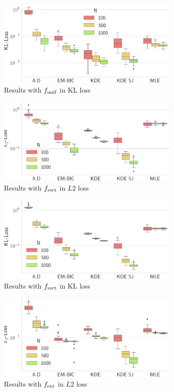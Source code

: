 \begin{figure}
    \includegraphics[width=0.8\textwidth]{./TeX_files/res_uniform_KL.png}
    \caption{Results with $f_{\textnormal{unif}}$ in KL loss}
    \label{fig:res_uniform_KL}
\end{figure}
\begin{figure}
    \includegraphics[width=0.8\textwidth]{./TeX_files/res_rect_L2.png}
    \caption{Results with $f_{\textnormal{rect}}$ in $L2$ loss}
    \label{fig:res_rect_L2}
\end{figure}

\begin{figure}
    \includegraphics[width=0.8\textwidth]{./TeX_files/res_rect_KL.png}
    \caption{Results with $f_{\textnormal{rect}}$ in KL loss}
    \label{fig:res_rect_KL}
\end{figure}   
\begin{figure}
    \includegraphics[width=0.8\textwidth]{./TeX_files/res_lapl_gauss_not_dict_L2.png}
    \caption{Results with $f_{\textnormal{ext}}$ in $L2$ loss}
    \label{fig:res_ext_L2}
\end{figure}

